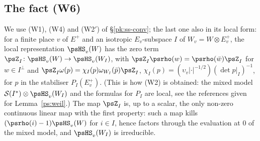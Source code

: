 \documentclass[10pt]{amsart}
\theoremstyle{definition}
\theoremstyle{remark}
\providecommand{\auS}{\mathcal S}
\begin{document}
\subsection{The fact {\rm(W6)}}\label{pf:ss-flip}

We use (W1), (W4) and (W2$'$) of \S\ref{pk:ss-conv}; the last one also in its local form: for a
finite place $v$ of $E^+$ and an isotropic $E_v$-subspace $I$ of $W_v=W\otimes E^+_v$, the local
representation $\psHS_v(W)$ has the zero term $\psZ_I\colon\psHS_v(W)\to\psHS_v(W_I)$, with
$\psZ_I\psrho(w)=\psrho(\bar w)\psZ_I$ for $w\in I^\perp$ and $\psZ_I\omega(p)=\chi_I(p)\omega_{W_I}
(\bar p)\psZ_I$, $\chi_I(p)=(\upsilon_v|\cdot|^{-1/2})(\det p|_I)^{-1}$, for $p$ in the stabiliser
$P_I(E^+_v)$. (This is how (W2) is obtained: the mixed model $\auS(I^*)\otimes\psHS_v(W_I)$ and
the formulas for $P_I$ are local, see the references given for Lemma~\ref{ps:weil}.) The map
$\psZ_I$ is, up to a scalar, the only non-zero continuous linear map with the first property:
such a map kills $(\psrho(i)-1)\psHS_v(W)$ for $i\in I$, hence factors through the evaluation at
$0$ of the mixed model, and $\psHS_v(W_I)$ is irreducible.
\end{document}
